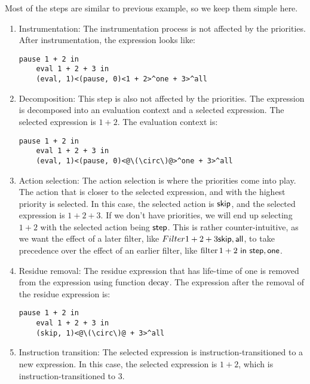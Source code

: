 Most of the steps are similar to previous example, so we keep them simple here.
\begin{enumerate}
  \item\label{agl:priority-example-instr} Instrumentation: The instrumentation process is not affected by the priorities. After instrumentation, the expression looks like:
  \begin{lstlisting}[language=hazel]
    pause 1 + 2 in
    eval 1 + 2 + 3 in
    (eval, 1)<(pause, 0)<1 + 2>^one + 3>^all
  \end{lstlisting}

  \item Decomposition: This step is also not affected by the priorities. The expression is decomposed into an evaluation context and a selected expression. The selected expression is \(1 + 2\). The evaluation context is:
  \begin{lstlisting}[language=hazel]
    pause 1 + 2 in
    eval 1 + 2 + 3 in
    (eval, 1)<(pause, 0)<@\(\circ\)@>^one + 3>^all
  \end{lstlisting}

  \item Action selection: The action selection is where the priorities come into play. The action that is closer to the selected expression, and with the highest priority is selected. In this case, the selected action is \(\mathsf{skip}\), and the selected expression is \(1 + 2 + 3\). If we don't have priorities, we will end up selecting \(1 + 2\) with the selected action being \(\mathsf{step}\). This is rather counter-intuitive, as we want the effect of a later filter, like \(Filter{1 + 2 + 3}{\mathsf{skip}, \mathsf{all}}\), to take precedence over the effect of an earlier filter, like \(\operatorname{filter}{} 1 + 2~\mathsf{in}~\mathsf{step}, \mathsf{one}\).

  \item Residue removal: The residue expression that has life-time of one is removed from the expression using function \(\operatorname{decay}\). The expression after the removal of the residue expression is:
  \begin{lstlisting}[language=hazel]
    pause 1 + 2 in
    eval 1 + 2 + 3 in
    (skip, 1)<@\(\circ\)@ + 3>^all
  \end{lstlisting}

  \item Instruction transition: The selected expression is instruction-transitioned to a new expression. In this case, the selected expression is \(1 + 2\), which is instruction-transitioned to \(3\).


\end{enumerate}
